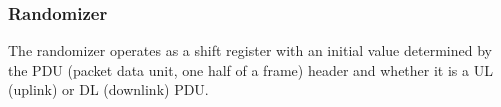 \documentclass[10pt]{article}
\begin{document}
	\subsubsection{Randomizer}
	The randomizer operates as a shift register with an initial value
	determined by the PDU (packet data unit, one half of a frame) header
	and whether it is a UL (uplink) or DL (downlink) PDU. 

%
% 
% 
% 
% 
% 
% 
\end{document}
